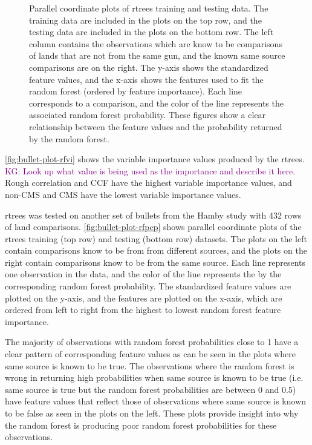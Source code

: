 \documentclass[AMS,STIX2COL]{WileyNJD-v2}\usepackage[]{graphicx}\usepackage[]{color}
\newenvironment{knitrout}{}{} %
\newcommand{\kgc}[1]{\textcolor{purple}{#1}}
\begin{document}
{\begin{figure}[!b]
\begin{knitrout}
\end{knitrout}
\caption{Parallel coordinate plots of rtrees training and testing data. The training data are included in the plots on the top row, and the testing data are included in the plots on the bottom row. The left column contains the observations which are know to be comparisons of lands that are not from the same gun, and the known same source comparisons are on the right. The y-axis shows the standardized feature values, and the x-axis shows the features used to fit the random forest (ordered by feature importance). Each line corresponds to a comparison, and the color of the line represents the associated random forest probability. These figures show a clear relationship between the feature values and the probability returned by the random forest.}
\label{fig:bullet-plot-rfpcp}
\end{figure}

\autoref{fig:bullet-plot-rfvi} shows the variable importance values produced by the rtrees. \kgc{KG: Look up what value is being used as the importance and describe it here.} Rough correlation and CCF have the highest variable importance values, and non-CMS and CMS have the lowest variable importance values.

rtrees was tested on another set of bullets from the Hamby study with 432 rows of land comparisons. \autoref{fig:bullet-plot-rfpcp} shows parallel coordinate plots of the rtrees training (top row) and testing (bottom row) datasets. The plots on the left contain comparisons know to be from from different sources, and the plots on the right contain comparisons know to be from the same source. Each line represents one observation in the data, and the color of the line represents the by the corresponding random forest probability. The standardized feature values are plotted on the y-axis, and the features are plotted on the x-axis, which are ordered from left to right from the highest to lowest random forest feature importance.

The majority of observations with random forest probabilities close to 1 have a clear pattern of corresponding feature values as can be seen in the plots where same source is known to be true. The observations where the random forest is wrong in returning high probabilities when same source is known to be true (i.e. same source is true but the random forest probabilities are between 0 and 0.5) have feature values that reflect those of observations where same source is known to be false as seen in the plots on the left. These plots provide insight into why the random forest is producing poor random forest probabilities for these observations.

}
\end{document}
